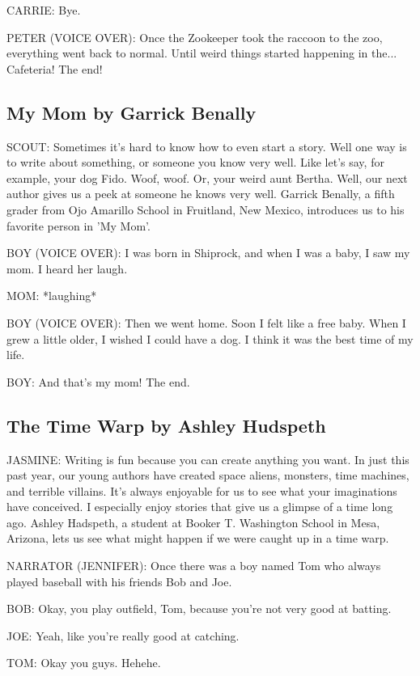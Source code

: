 CARRIE:
Bye.

PETER (VOICE OVER):
Once the Zookeeper took the raccoon to the zoo, everything went back to normal.
Until weird things started happening in the...
Cafeteria!
The end!

\subsection{My Mom by Garrick Benally}

SCOUT:
Sometimes it's hard to know how to even start a story.
Well one way is to write about something, or someone you know very well.
Like let's say, for example, your dog Fido.
Woof, woof.
Or, your weird aunt Bertha.
Well, our next author gives us a peek at someone he knows very well.
Garrick Benally, a fifth grader from Ojo Amarillo School in Fruitland, New Mexico, introduces us to his favorite person in 'My Mom'.

BOY (VOICE OVER):
I was born in Shiprock, and when I was a baby, I saw my mom.
I heard her laugh.

MOM:
*laughing*

BOY (VOICE OVER):
Then we went home.
Soon I felt like a free baby.
When I grew a little older, I wished I could have a dog.
I think it was the best time of my life.

BOY:
And that's my mom!
The end.

\subsection{The Time Warp by Ashley Hudspeth}

JASMINE:
Writing is fun because you can create anything you want.
In just this past year, our young authors have created space aliens, monsters, time machines, and terrible villains.
It's always enjoyable for us to see what your imaginations have conceived.
I especially enjoy stories that give us a glimpse of a time long ago.
Ashley Hadspeth, a student at Booker T. Washington School in Mesa, Arizona, lets us see what might happen if we were caught up in a time warp.

NARRATOR (JENNIFER):
Once there was a boy named Tom who always played baseball with his friends Bob and Joe.

BOB:
Okay, you play outfield, Tom, because you're not very good at batting.

JOE:
Yeah, like you're really good at catching.

TOM:
Okay you guys.
Hehehe.

